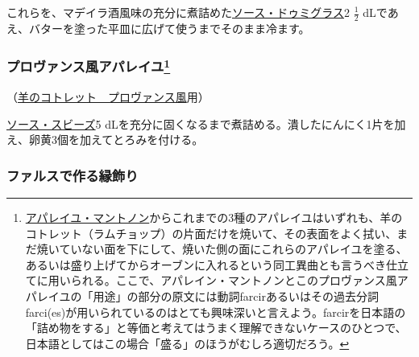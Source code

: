 \begin{recette}
これらを、マデイラ酒風味の充分に煮詰めた\protect\hyperlink{sauce-demi-glace}{ソース・ドゥミグラス}2
\(\frac{1}{2}\)
dLであえ、バターを塗った平皿に広げて使うまでそのまま冷ます。

\hypertarget{appareil-provencal}{%
\subsubsection[プロヴァンス風アパレイユ]{\texorpdfstring{プロヴァンス風アパレイユ\footnote{\protect\hyperlink{appareil-maintenon}{アパレイユ・マントノン}からこれまでの3種のアパレイユはいずれも、羊のコトレット（ラムチョップ）の片面だけを焼いて、その表面をよく拭い、まだ焼いていない面を下にして、焼いた側の面にこれらのアパレイユを塗る、あるいは盛り上げてからオーブンに入れるという同工異曲とも言うべき仕立てに用いられる。ここで、アパレイン・マントノンとこのプロヴァンス風アパレイユの「用途」の部分の原文には動詞farcirあるいはその過去分詞farci(es)が用いられているのはとても興味深いと言えよう。farcirを日本語の「詰め物をする」と等価と考えてはうまく理解できないケースのひとつで、日本語としてはこの場合「盛る」のほうがむしろ適切だろう。}}{プロヴァンス風アパレイユ}}\label{appareil-provencal}}



（\protect\hyperlink{cotelettes-provencale}{羊のコトレット　プロヴァンス風}用）

\protect\hyperlink{sauce-soubise}{ソース・スビーズ}5
dLを充分に固くなるまで煮詰める。潰したにんにく1片を加え、卵黄3個を加えてとろみを付ける。

\hypertarget{bordures-en-farce}{%
\subsubsection{ファルスで作る縁飾り}\label{bordures-en-farce}}




\end{recette}
